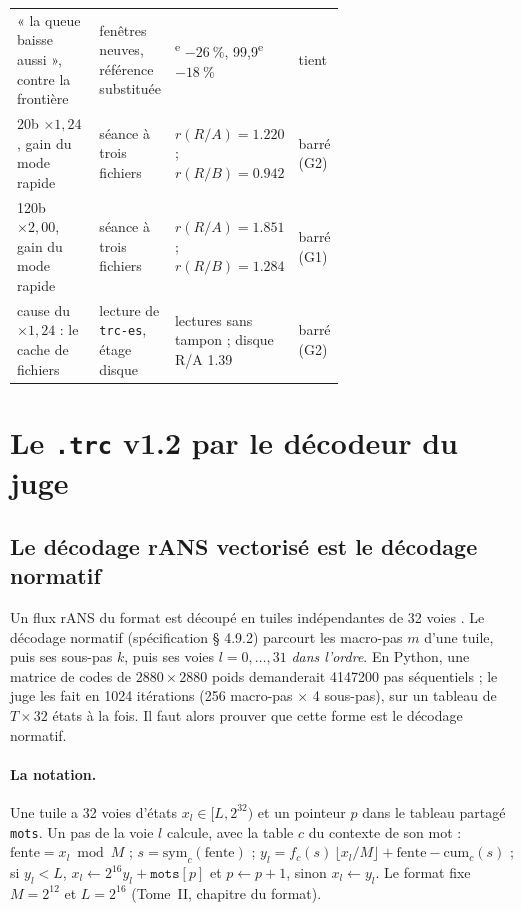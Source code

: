 \begin{table}[ht]
\begin{tabularx}{\linewidth}{@{}>{\raggedright\arraybackslash}p{0.28\linewidth}>{\raggedright\arraybackslash}X>{\raggedright\arraybackslash}p{0.24\linewidth}>{\raggedright\arraybackslash}p{0.13\linewidth}@{}}
« la queue baisse aussi », contre la frontière & fenêtres neuves, référence substituée & 99\textsuperscript{e} $-\SI{26}{\percent}$, 99,9\textsuperscript{e} $-\SI{18}{\percent}$ & tient \\
20b $\times 1{,}24$, gain du mode rapide & séance à trois fichiers & $r(R/A) = \num{1.220}$ ; $r(R/B) = \num{0.942}$ & barré (G2) \\
120b $\times 2{,}00$, gain du mode rapide & séance à trois fichiers & $r(R/A) = \num{1.851}$ ; $r(R/B) = \num{1.284}$ & barré (G1) \\
cause du $\times 1{,}24$ : le cache de fichiers & lecture de \texttt{trc-es}, étage disque & lectures sans tampon ; disque R/A \num{1.39} & barré (G2) \\
\bottomrule
\end{tabularx}
\end{table}

\section{Le \texttt{.trc} v1.2 par le décodeur du juge}\label{t3jug:sec:jt}

\subsection{Le décodage rANS vectorisé est le décodage normatif}\label{t3jug:sec:vectorise}

Un flux rANS du format est découpé en tuiles indépendantes de 32 voies \parencite{duda2013ans,giesen2014interleaved}. Le décodage normatif (spécification § 4.9.2) parcourt les macro-pas $m$ d'une tuile, puis ses sous-pas $k$, puis ses voies $l = 0, \dots, 31$ \emph{dans l'ordre}. En Python, une matrice de codes de $\num{2880} \times \num{2880}$ poids demanderait \num{4147200} pas séquentiels ; le juge les fait en \num{1024} itérations (256 macro-pas $\times$ 4 sous-pas), sur un tableau de $T \times 32$ états à la fois. Il faut alors prouver que cette forme est le décodage normatif.

\paragraph{La notation.} Une tuile a 32 voies d'états $x_l \in [L, 2^{32})$ et un pointeur $p$ dans le tableau partagé \texttt{mots}. Un pas de la voie $l$ calcule, avec la table $c$ du contexte de son mot : $\text{fente} = x_l \bmod M$ ; $s = \mathrm{sym}_c(\text{fente})$ ; $y_l = f_c(s)\,\lfloor x_l / M\rfloor + \text{fente} - \mathrm{cum}_c(s)$ ; si $y_l < L$, $x_l \leftarrow 2^{16} y_l + \texttt{mots}[p]$ et $p \leftarrow p + 1$, sinon $x_l \leftarrow y_l$. Le format fixe $M = 2^{12}$ et $L = 2^{16}$ (Tome~II, chapitre du format).

